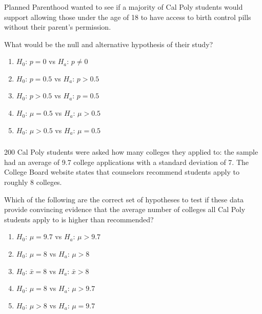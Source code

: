 \begin{frame}
\frametitle{\grp}
Planned Parenthood wanted to see if a majority of Cal Poly students would support allowing those under the age of 18 to have access to birth control pills without their parent’s permission.
\begin{clicker}{What would be the null and alternative hypothesis of their study?}
\begin{enumerate}
    \item
    $H_0$: $p=0$ vs $H_a$: $p \neq 0$
    \item
    $H_0$: $p=0.5$ vs $H_a$: $p > 0.5$
    \item
    $H_0$: $p>0.5$ vs $H_a$: $p = 0.5$
    \item
    $H_0$: $\mu=0.5$ vs $H_a$: $\mu > 0.5$
    \item
    $H_0$: $\mu>0.5$ vs $H_a$: $\mu = 0.5$
\end{enumerate}
\end{clicker}
\end{frame}

\begin{frame}
\frametitle{\grp}
200 Cal Poly students were asked how many colleges they applied to: the sample had an average of 9.7 college applications with a standard deviation of 7.  The College Board website states that counselors recommend students apply to roughly 8 colleges.
\begin{clicker}{Which of the following are the correct set of hypotheses to test if these data provide convincing evidence that the average number of colleges all Cal Poly students apply to is higher than recommended?}
\begin{enumerate}
    \item
    $H_0$: $\mu=9.7$ vs $H_a$: $\mu > 9.7$
    \item
    $H_0$: $\mu=8$ vs $H_a$: $\mu > 8$
    \item
    $H_0$: $\bar{x}=8$ vs $H_a$: $\bar{x} > 8$
    \item
    $H_0$: $\mu=8$ vs $H_a$: $\mu > 9.7$
    \item
    $H_0$: $\mu>8$ vs $H_a$: $\mu = 9.7$
\end{enumerate}
\end{clicker}
\end{frame}

